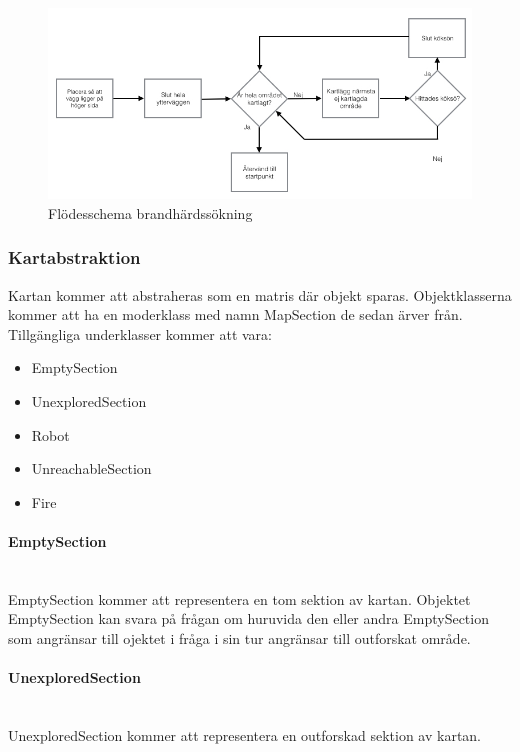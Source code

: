 \documentclass[a4paper,12pt,fleqn]{article}
\begin{document}
\begin{figure}[htp] %
  \begin{center}
  \includegraphics[keepaspectratio=true,scale=0.5]{bilder/Flode_kartritning.jpg}  %
  \end{center}
  \caption{Flödesschema brandhärdssökning} %
  \label{fig:fire} %
\end{figure}


\subsubsection{Kartabstraktion}
Kartan kommer att abstraheras som en matris där objekt sparas. Objektklasserna kommer att ha en moderklass med namn MapSection de sedan ärver från. Tillgängliga underklasser kommer att vara:

\begin{itemize}
\item{EmptySection}
\item{UnexploredSection}
\item{Robot}
\item{UnreachableSection}
\item{Fire}
\end{itemize}

\paragraph{EmptySection} 
~\\
EmptySection kommer att representera en tom sektion av kartan. Objektet EmptySection kan svara på frågan om huruvida den eller andra EmptySection som angränsar till ojektet i fråga i sin tur angränsar till outforskat område. 

\paragraph{UnexploredSection} 
~\\
UnexploredSection kommer att representera en outforskad sektion av kartan. 
\end{document}
